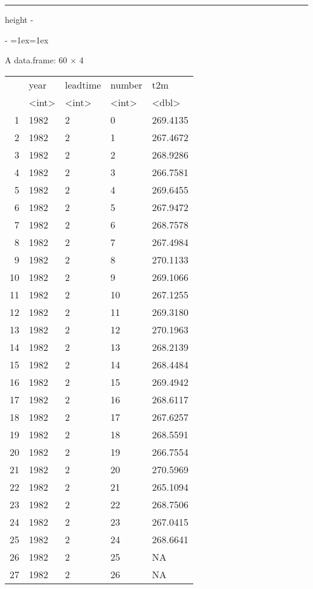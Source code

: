 \documentclass[letterpaper,10pt,english]{sphinxmanual}
\makeatletter
\newenvironment{nbsphinxfancyoutput}{%
    \let\sphinxincludegraphics\nbsphinxincludegraphics
    \nbsphinx@image@maxheight\textheight
    \advance\nbsphinx@image@maxheight -2\fboxsep   %
    \advance\nbsphinx@image@maxheight -2\fboxrule  %
    \advance\nbsphinx@image@maxheight -\baselineskip
\def\nbsphinxfcolorbox{\spx@fcolorbox{nbsphinx-code-border}{white}}%
\def\FrameCommand{\nbsphinxfcolorbox\nbsphinxfancyaddprompt\@empty}%
\def\FirstFrameCommand{\nbsphinxfcolorbox\nbsphinxfancyaddprompt\sphinxVerbatim@Continues}%
\def\MidFrameCommand{\nbsphinxfcolorbox\sphinxVerbatim@Continued\sphinxVerbatim@Continues}%
\def\LastFrameCommand{\nbsphinxfcolorbox\sphinxVerbatim@Continued\@empty}%
\MakeFramed{\advance\hsize-\width\@totalleftmargin\z@\linewidth\hsize\@setminipage}%
\lineskip=1ex\lineskiplimit=1ex\raggedright%
}{\par\unskip\@minipagefalse\endMakeFramed}
\def\nbsphinxfancyaddprompt{\ifvoid\nbsphinxpromptbox\else
    \kern\fboxrule\kern\fboxsep
    \copy\nbsphinxpromptbox
    \kern-\ht\nbsphinxpromptbox\kern-\dp\nbsphinxpromptbox
    \kern-\fboxsep\kern-\fboxrule\nointerlineskip
    \fi}
\newlength\nbsphinxcodecellspacing
\newcommand*{\nbsphinxincludegraphics}[2][]{%
    \gdef\spx@includegraphics@options{#1}%
    \setbox\spx@image@box\hbox{\texttt{[image: \#2]}}%
    \in@false
    \ifdim \wd\spx@image@box>\linewidth
      \g@addto@macro\spx@includegraphics@options{,width=\linewidth}%
      \in@true
    \fi
    \ifdim \ht\spx@image@box>\nbsphinx@image@maxheight
      \g@addto@macro\spx@includegraphics@options{,height=\nbsphinx@image@maxheight}%
      \in@true
    \fi
    \ifin@
      \g@addto@macro\spx@includegraphics@options{,keepaspectratio}%
    \fi
    \setbox\spx@image@box\box\voidb@x %
    \expandafter\includegraphics\expandafter[\spx@includegraphics@options]{#2}%
}%
\makeatother
\begin{document}
\hrule height -\fboxrule\relax
\vspace{\nbsphinxcodecellspacing}

\makeatletter\setbox\nbsphinxpromptbox\box\voidb@x\makeatother

\begin{nbsphinxfancyoutput}
A data.frame: 60 × 4
\begin{tabular}{r|llll}
  & year & leadtime & number & t2m\\
  & <int> & <int> & <int> & <dbl>\\
\hline
    1 & 1982 & 2 &  0 & 269.4135\\
    2 & 1982 & 2 &  1 & 267.4672\\
    3 & 1982 & 2 &  2 & 268.9286\\
    4 & 1982 & 2 &  3 & 266.7581\\
    5 & 1982 & 2 &  4 & 269.6455\\
    6 & 1982 & 2 &  5 & 267.9472\\
    7 & 1982 & 2 &  6 & 268.7578\\
    8 & 1982 & 2 &  7 & 267.4984\\
    9 & 1982 & 2 &  8 & 270.1133\\
    10 & 1982 & 2 &  9 & 269.1066\\
    11 & 1982 & 2 & 10 & 267.1255\\
    12 & 1982 & 2 & 11 & 269.3180\\
    13 & 1982 & 2 & 12 & 270.1963\\
    14 & 1982 & 2 & 13 & 268.2139\\
    15 & 1982 & 2 & 14 & 268.4484\\
    16 & 1982 & 2 & 15 & 269.4942\\
    17 & 1982 & 2 & 16 & 268.6117\\
    18 & 1982 & 2 & 17 & 267.6257\\
    19 & 1982 & 2 & 18 & 268.5591\\
    20 & 1982 & 2 & 19 & 266.7554\\
    21 & 1982 & 2 & 20 & 270.5969\\
    22 & 1982 & 2 & 21 & 265.1094\\
    23 & 1982 & 2 & 22 & 268.7506\\
    24 & 1982 & 2 & 23 & 267.0415\\
    25 & 1982 & 2 & 24 & 268.6641\\
    26 & 1982 & 2 & 25 &       NA\\
    27 & 1982 & 2 & 26 &       NA\\

\end{tabular}
\end{nbsphinxfancyoutput}
\end{document}
